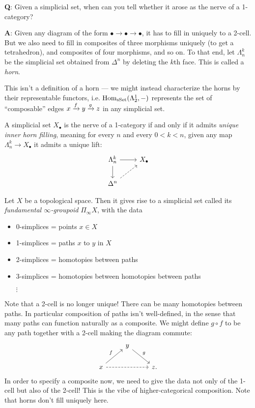 \documentclass[11pt,openany]{book}
\begin{document}
\textbf{Q}: Given a simplicial set, when can you tell whether it arose as the nerve of a 1-category?

\textbf{A}: Given any diagram of the form $\bullet \to \bullet \to \bullet$, it has to fill in uniquely to a 2-cell. But we also need to fill in composites of three morphisms uniquely (to get a tetrahedron), and composites of four morphisms, and so on. To that end, let $\Lambda^k_n$ be the simplicial set obtained from $\Delta^n$ by deleting the $k$th face. This is called a \textit{horn}.

This isn't a definition of a horn --- we might instead characterize the horns by their representable functors, i.e. $\mathrm{Hom}_{\mathrm{sSet}}(\Lambda_2^1,-)$ represents the set of ``composable'' edges $x \xrightarrow{f} y \xrightarrow{g} z$ in any simplicial set.

\begin{proposition} A simplicial set $X_\bullet$ is the nerve of a 1-category if and only if it admits \textit{unique inner horn filling}, meaning for every $n$ and every $0 < k < n$, given any map $\Lambda^k_n \to X_\bullet$ it admits a unique lift:
\[ \begin{tikzcd}
    \Lambda^k_n\rar\dar & X_\bullet\\
    \Delta^n\ar[ur,dashed] & 
\end{tikzcd} \]
\end{proposition}



\begin{example} Let $X$ be a topological space. Then it gives rise to a simplicial set called its \textit{fundamental $\infty$-groupoid} $\Pi_{\infty} X$, with the data
\begin{itemize}
    \item 0-simplices = points $x \in X$
    \item 1-simplices = paths $x$ to $y$ in $X$
    \item 2-simplices = homotopies between paths
    \item 3-simplices = homotopies between homotopies between paths
    \item[$\vdots$]
\end{itemize}
Note that a 2-cell is no longer unique! There can be many homotopies between paths. In particular composition of paths isn't well-defined, in the sense that many paths can function naturally as a composite. We might define $g\circ f$ to be any path together with a 2-cell making the diagram commute:
\[ \begin{tikzcd}
     & y\ar[dr,"g" above right]\\
    x\ar[ur,"f" above left]\ar[rr,dashed] &  & z.
\end{tikzcd} \]
In order to specify a composite now, we need to give the data not only of the 1-cell but also of the 2-cell! This is the vibe of higher-categorical composition. Note that horns don't fill uniquely here.
\end{example}
\end{document}
